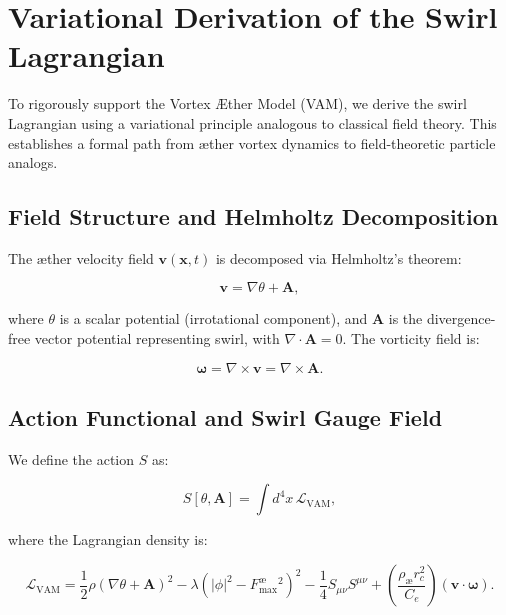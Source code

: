\section{Variational Derivation of the Swirl Lagrangian}

To rigorously support the Vortex Æther Model (VAM), we derive the swirl Lagrangian using a variational principle analogous to classical field theory. This establishes a formal path from æther vortex dynamics to field-theoretic particle analogs.

\subsection{Field Structure and Helmholtz Decomposition}

The æther velocity field $\mathbf{v}(\mathbf{x}, t)$ is decomposed via Helmholtz's theorem:

\begin{equation}
\mathbf{v} = \nabla \theta + \mathbf{A},
\end{equation}

where $\theta$ is a scalar potential (irrotational component), and $\mathbf{A}$ is the divergence-free vector potential representing swirl, with $\nabla \cdot \mathbf{A} = 0$. The vorticity field is:

\begin{equation}
\boldsymbol{\omega} = \nabla \times \mathbf{v} = \nabla \times \mathbf{A}.
\end{equation}

\subsection{Action Functional and Swirl Gauge Field}

We define the action $S$ as:

\begin{equation}
S[\theta, \mathbf{A}] = \int d^4x \, \mathcal{L}_{\text{VAM}},
\end{equation}

where the Lagrangian density is:

\begin{equation}
\mathcal{L}_{\text{VAM}} = \frac{1}{2} \rho (\nabla \theta + \mathbf{A})^2 - \lambda (|\phi|^2 - F^{\text{\ae}}_{\text{max}}^2)^2 - \frac{1}{4} S_{\mu\nu} S^{\mu\nu} + \left( \frac{\rho_{\text{æ}} r_c^2}{C_e} \right) (\mathbf{v} \cdot \boldsymbol{\omega}).
\end{equation}

